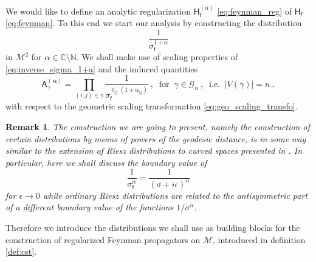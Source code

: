 \documentclass[11pt]{book}
\newcommand{\alphabd}{\boldsymbol{\alpha}}
\newcommand{\abs}[1]{\left|#1\right|}
\newcommand{\Gcal}{\mathcal{G}}
\newcommand{\Mcal}{\mathcal{M}}
\newcommand{\Cbb}{\mathbb{C}}
\newcommand{\Nbb}{\mathbb{N}}
\newcommand{\Asf}{\mathsf{A}}
\newcommand{\Hsf}{\mathsf{H}}
\newcommand{\fsf}{\mathsf{f}}
\theoremstyle{break}
\newtheorem{remark}{Remark}[chapter]
\begin{document}
We would like to define an analytic regularization $\Hsf^{(\alpha)}_\fsf$ \eqref{eq:feynman_reg} of $\Hsf_\fsf$ \eqref{eq:feynman}. To this end we start our analysis by constructing the distribution 
%
\begin{equation}
\frac{1}{\sigma_\fsf^{1+\alpha}}
\label{eq:inverse_sigma_1+a}
\end{equation}
%
in $\Mcal^2$ for $\alpha \in \Cbb \setminus \Nbb$. We shall make use of scaling properties of \eqref{eq:inverse_sigma_1+a} and the induced quantities 
%
\begin{equation}
\Asf_\gamma^{(\alphabd)} = \prod_{(i,j)\in\gamma} \frac{1}{\sigma_\fsf^{\ell_{ij}(1+\alpha_{ij})}} \ , \ \mbox{ for } \ \gamma \in \Gcal_n \ , \ \mbox{ i.e. } \ \abs{V(\gamma)}=n \ ,
\label{eq:amplitude_sigma_reg}
\end{equation}
%
with respect to the geometric scaling transformation \eqref{eq:geo_scaling_transfo}. 

\begin{remark}
The construction we are going to present, namely the construction of certain distributions by means of powers of the geodesic distance, is in some way similar to the extension of Riesz distributions to curved spaces presented in \cite{baer_wave_2008}. In particular, here we shall discuss the boundary value of 
%
\begin{equation*}
\frac{1}{\sigma_\fsf^\alpha} = \frac{1}{(\sigma+i\epsilon)^{\alpha}} 
\end{equation*}
%
for $\epsilon\to0$ while ordinary Riesz distributions are related to the antisymmetric part of a different boundary value of the functions $1/\sigma^\alpha$.
\end{remark}


Therefore we introduce the distributions we shall use as building blocks for the construction of regularized Feynman propagators on $\Mcal$, introduced in definition \ref{def:cst}. 
\end{document}
